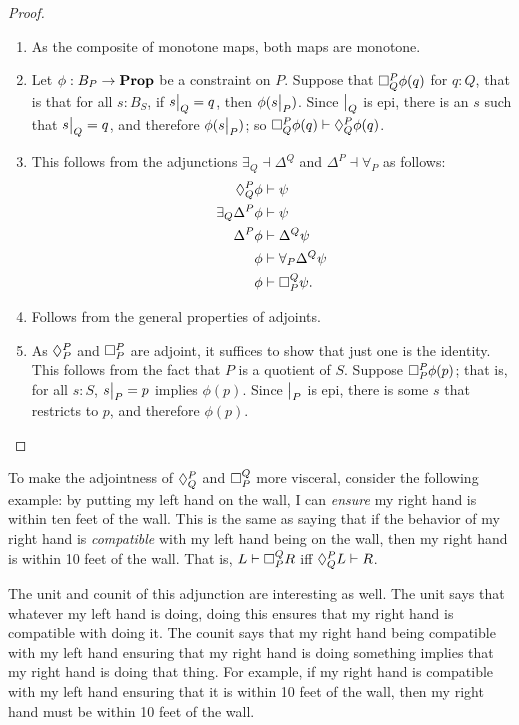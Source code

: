     \begin{proof}
    ~
    \begin{enumerate}
        \item As the composite of monotone maps, both maps are monotone.
        \item Let $\phi : B_P \to \Prop$ be a constraint on $P$. Suppose that $\ensure{P}{Q}\phi(q)$ for $q : Q$, that is that for all $s : B_S$, if $\rest{s}{Q} = q$, then $\phi(\rest{s}{P})$. Since $\rest{}{Q}$ is epi, there is an $s$ such that $\rest{s}{Q} = q$, and therefore $\phi(\rest{s}{P})$; so $\ensure{P}{Q}\phi(q) \vdash \compat{P}{Q}\phi(q)$.
        \item This follows from the adjunctions $\exists_Q \dashv \Delta^Q$ and $\Delta^P \dashv \forall_P$ as follows:
        \begin{align*}
            \compat{P}{Q} \phi &\vdash \psi \\ 
            \exists_Q \Delta^P \phi &\vdash \psi \\
            \Delta^P \phi &\vdash \Delta^Q \psi \\ 
            \phi &\vdash \forall_P \Delta^Q \psi \\
            \phi &\vdash \ensure{Q}{P} \psi.
        \end{align*}
        \item Follows from the general properties of adjoints.
        \item As $\compat{P}{P}$ and $\ensure{P}{P}$ are adjoint, it suffices to show that just one is the identity. This follows from the fact that $P$ is a quotient of $S$. Suppose $\ensure{P}{P}\phi(p)$; that is, for all $s : S$, $\rest{s}{P} = p$ implies $\phi(p)$. Since $\rest{}{P}$ is epi, there is some $s$ that restricts to $p$, and therefore $\phi(p)$. \qedhere
        
    \end{enumerate}
    \end{proof}
    
 To make the adjointness of $\compat{P}{Q}$ and $\ensure{Q}{P}$ more visceral, consider the following example: by putting my left hand on the wall, I can \emph{ensure} my right hand is within ten feet of the wall. This is the same as saying that if the behavior of my right hand is \emph{compatible} with my left hand being on the wall, then my right hand is within 10 feet of the wall. That is, $L\vdash\ensure{Q}{P}R$ iff $\compat{P}{Q}L\vdash R$.
    
    The unit and counit of this adjunction are interesting as well. The unit says that whatever my left hand is doing, doing this ensures that my right hand is compatible with doing it. The counit says that my right hand being compatible with my left hand ensuring that my right hand is doing something implies that my right hand is doing that thing. For example, if my right hand is compatible with my left hand ensuring that it is within 10 feet of the wall, then my right hand must be within 10 feet of the wall.
    
